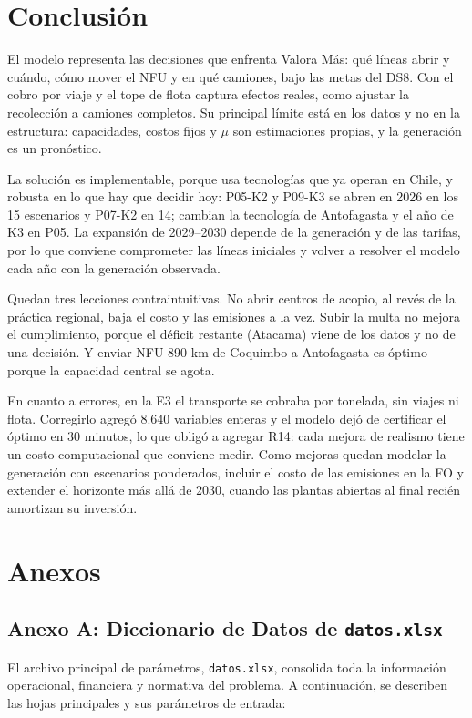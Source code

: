 \documentclass[letterpaper]{article}
\begin{document}
\section{Conclusión}

El modelo representa las decisiones que enfrenta Valora Más: qué líneas abrir y cuándo, cómo mover el NFU y en qué camiones, bajo las metas del DS8. Con el cobro por viaje y el tope de flota captura efectos reales, como ajustar la recolección a camiones completos. Su principal límite está en los datos y no en la estructura: capacidades, costos fijos y $\mu$ son estimaciones propias, y la generación es un pronóstico.

La solución es implementable, porque usa tecnologías que ya operan en Chile, y robusta en lo que hay que decidir hoy: P05-K2 y P09-K3 se abren en 2026 en los 15 escenarios y P07-K2 en 14; cambian la tecnología de Antofagasta y el año de K3 en P05. La expansión de 2029--2030 depende de la generación y de las tarifas, por lo que conviene comprometer las líneas iniciales y volver a resolver el modelo cada año con la generación observada.

Quedan tres lecciones contraintuitivas. No abrir centros de acopio, al revés de la práctica regional, baja el costo y las emisiones a la vez. Subir la multa no mejora el cumplimiento, porque el déficit restante (Atacama) viene de los datos y no de una decisión. Y enviar NFU 890 km de Coquimbo a Antofagasta es óptimo porque la capacidad central se agota.

En cuanto a errores, en la E3 el transporte se cobraba por tonelada, sin viajes ni flota. Corregirlo agregó $8.640$ variables enteras y el modelo dejó de certificar el óptimo en 30 minutos, lo que obligó a agregar R14: cada mejora de realismo tiene un costo computacional que conviene medir. Como mejoras quedan modelar la generación con escenarios ponderados, incluir el costo de las emisiones en la FO y extender el horizonte más allá de 2030, cuando las plantas abiertas al final recién amortizan su inversión.

\clearpage
\section{Anexos}
\begingroup
\small
\sloppy
\subsection*{Anexo A: Diccionario de Datos de \texttt{datos.xlsx}}
El archivo principal de parámetros, \texttt{datos.xlsx}, consolida toda la información operacional, financiera y normativa del problema. A continuación, se describen las hojas principales y sus parámetros de entrada:
\end{document}
